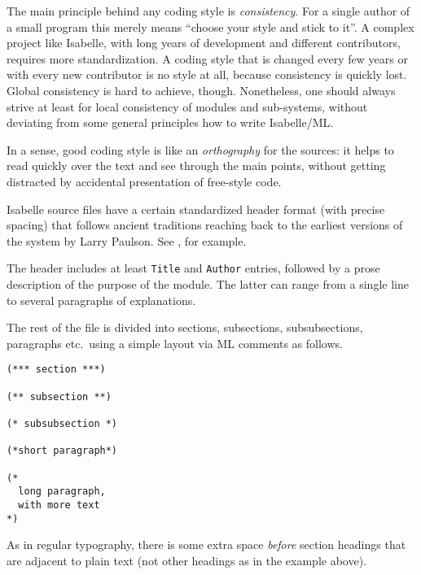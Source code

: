 \begin{isabellebody}
\begin{isamarkuptext}
  The main principle behind any coding style is \emph{consistency}.
  For a single author of a small program this merely means ``choose
  your style and stick to it''.  A complex project like Isabelle, with
  long years of development and different contributors, requires more
  standardization.  A coding style that is changed every few years or
  with every new contributor is no style at all, because consistency
  is quickly lost.  Global consistency is hard to achieve, though.
  Nonetheless, one should always strive at least for local consistency
  of modules and sub-systems, without deviating from some general
  principles how to write Isabelle/ML.

  In a sense, good coding style is like an \emph{orthography} for the
  sources: it helps to read quickly over the text and see through the
  main points, without getting distracted by accidental presentation
  of free-style code.%
\end{isamarkuptext}%
\isamarkuptrue%
%
\isamarkuptrue%
%
\begin{isamarkuptext}%
Isabelle source files have a certain standardized header
  format (with precise spacing) that follows ancient traditions
  reaching back to the earliest versions of the system by Larry
  Paulson.  See \hyperlink{file.~~/src/Pure/thm.ML}{\mbox{}}, for example.

  The header includes at least \verb|Title| and \verb|Author| entries, followed by a prose description of the purpose of
  the module.  The latter can range from a single line to several
  paragraphs of explanations.

  The rest of the file is divided into sections, subsections,
  subsubsections, paragraphs etc.\ using a simple layout via ML
  comments as follows.

\begin{verbatim}
(*** section ***)

(** subsection **)

(* subsubsection *)

(*short paragraph*)

(*
  long paragraph,
  with more text
*)
\end{verbatim}

  As in regular typography, there is some extra space \emph{before}
  section headings that are adjacent to plain text (not other headings
  as in the example above).


\end{isamarkuptext}
\end{isabellebody}
